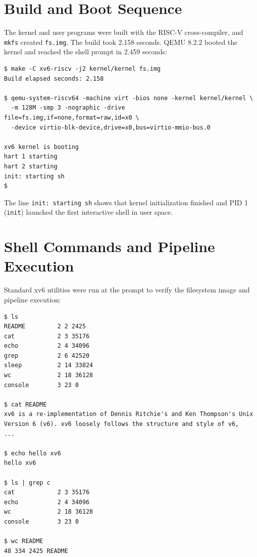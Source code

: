 \documentclass{assets/utmreport}
\begin{document}
\section{Build and Boot Sequence}
The kernel and user programs were built with the RISC-V cross-compiler, and \texttt{mkfs} created \texttt{fs.img}. The build took 2.158 seconds. QEMU 8.2.2 booted the kernel and reached the shell prompt in 2.459 seconds:

\begin{verbatim}
$ make -C xv6-riscv -j2 kernel/kernel fs.img
Build elapsed seconds: 2.158

$ qemu-system-riscv64 -machine virt -bios none -kernel kernel/kernel \
  -m 128M -smp 3 -nographic -drive file=fs.img,if=none,format=raw,id=x0 \
  -device virtio-blk-device,drive=x0,bus=virtio-mmio-bus.0

xv6 kernel is booting
hart 1 starting
hart 2 starting
init: starting sh
$
\end{verbatim}

The line \texttt{init: starting sh} shows that kernel initialization finished and PID 1 (\texttt{init}) launched the first interactive shell in user space.

\section{Shell Commands and Pipeline Execution}
Standard xv6 utilities were run at the prompt to verify the filesystem image and pipeline execution:
\begin{verbatim}
$ ls
README         2 2 2425
cat            2 3 35176
echo           2 4 34096
grep           2 6 42520
sleep          2 14 33824
wc             2 18 36128
console        3 23 0

$ cat README
xv6 is a re-implementation of Dennis Ritchie's and Ken Thompson's Unix
Version 6 (v6). xv6 loosely follows the structure and style of v6,
...

$ echo hello xv6
hello xv6

$ ls | grep c
cat            2 3 35176
echo           2 4 34096
wc             2 18 36128
console        3 23 0

$ wc README
48 334 2425 README
\end{verbatim}
\end{document}

